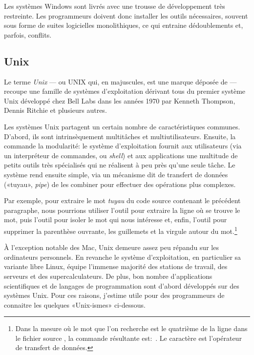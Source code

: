 Les systèmes Windows sont livrés avec une trousse de développement
très restreinte. Les programmeurs doivent donc installer les outils
nécessaires, souvent sous forme de suites logicielles monolithiques,
ce qui entraine dédoublements et, parfois, conflits.

\subsection{Unix}
\label{sec:informatique:os:unix}

Le terme \emph{Unix} --- ou UNIX qui, en majuscules, est
une marque déposée de 
--- recoupe une famille de systèmes d'exploitation dérivant tous du
premier système Unix développé chez Bell Labs dans les années 1970 par
Kenneth Thompson, Dennis Ritchie et plusieurs autres.

Les systèmes Unix partagent un certain nombre de caractéristiques
communes. D'abord, ils sont intrinsèquement multitâches et
multiutilisateurs. Ensuite, la
 commande la modularité: le système d'exploitation fournit aux
utilisateurs (via un interpréteur de commandes, ou \emph{shell}) et
aux applications une multitude de petits outils très spécialisés qui
ne réalisent à peu près qu'une seule tâche. Le système rend ensuite
simple, via un mécanisme dit de transfert de données («tuyau»,
\emph{pipe}) de les combiner pour effectuer des opérations plus
complexes.

Par exemple, pour extraire le mot \emph{tuyau} du code source
contenant le précédent paragraphe, nous pourrions utiliser l'outil
 pour extraire la ligne où se trouve le mot, puis l'outil
 pour isoler le mot qui nous intéresse et, enfin, l'outil
 pour supprimer la parenthèse ouvrante, les guillemets et la
virgule autour du mot.\footnote{%
  Dans la mesure où le mot que l'on recherche est le quatrième de la
  ligne dans le fichier source , la commande
  résultante est: \,. Le caractère \code{\textbar} est
  l'opérateur de transfert de données.}

À l'exception notable des Mac, Unix demeure assez peu
répandu sur les ordinateurs personnels. En revanche le système
d'exploitation, en particulier sa variante libre Linux, équipe
l'immense majorité des stations de travail, des serveurs et des
supercalculateurs. De plus, bon nombre d'applications scientifiques et
de langages de programmation sont d'abord développés sur des systèmes
Unix. Pour ces raisons, j'estime utile pour des programmeurs de
connaitre les quelques «Unix-ismes» ci-dessous.

